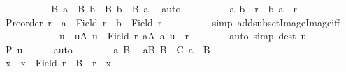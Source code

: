 \begin{isabellebody}
\ \ \ \ \ \ \isamarkupfalse%
\ {}\ \isamarkupfalse%
\ {\isachardoublequoteopen}{\isacharquery}{\kern0pt}B\ a\ {\isasymsubseteq}\ {\isacharquery}{\kern0pt}B\ b\ {\isasymor}\ {\isacharquery}{\kern0pt}B\ b\ {\isasymsubseteq}\ {\isacharquery}{\kern0pt}B\ a{\isachardoublequoteclose}\ \isamarkupfalse%
\ auto\isanewline
\ \ \ \ \ \ \isamarkupfalse%
\ \isamarkupfalse%
\ {\isachardoublequoteopen}{\isacharparenleft}{\kern0pt}a{\isacharcomma}{\kern0pt}\ b{\isacharparenright}{\kern0pt}\ {\isasymin}\ r\ {\isasymor}\ {\isacharparenleft}{\kern0pt}b{\isacharcomma}{\kern0pt}\ a{\isacharparenright}{\kern0pt}\ {\isasymin}\ r{\isachardoublequoteclose}\isanewline
\ \ \ \ \ \ \ \ \isamarkupfalse%
\ {\isacartoucheopen}Preorder\ r{\isacartoucheclose}\ \ {\isacartoucheopen}a\ {\isasymin}\ Field\ r{\isacartoucheclose}\ \ {\isacartoucheopen}b\ {\isasymin}\ Field\ r{\isacartoucheclose}\isanewline
\ \ \ \ \ \ \ \ \isamarkupfalse%
\ {\isacharparenleft}{\kern0pt}simp\ add{\isacharcolon}{\kern0pt}subset{\isacharunderscore}{\kern0pt}Image{}{\isacharunderscore}{\kern0pt}Image{}{\isacharunderscore}{\kern0pt}iff{\isacharparenright}{\kern0pt}\isanewline
\ \ \ \ \isamarkupfalse%
\isanewline
\ \ \ \ \isamarkupfalse%
\ \isamarkupfalse%
\ u\ \ uA{\isacharcolon}{\kern0pt}\ {\isachardoublequoteopen}u\ {\isasymin}\ Field\ r{\isachardoublequoteclose}\ {\isachardoublequoteopen}{\isasymforall}a{\isasymin}{\isacharquery}{\kern0pt}A{\isachardot}{\kern0pt}\ {\isacharparenleft}{\kern0pt}a{\isacharcomma}{\kern0pt}\ u{\isacharparenright}{\kern0pt}\ {\isasymin}\ r{\isachardoublequoteclose}\isanewline
\ \ \ \ \ \ \isamarkupfalse%
\ {\isacharparenleft}{\kern0pt}auto\ simp{\isacharcolon}{\kern0pt}\ dest{\isacharcolon}{\kern0pt}\ u{\isacharparenright}{\kern0pt}\isanewline
\ \ \ \ \isamarkupfalse%
\ {\isachardoublequoteopen}{\isacharquery}{\kern0pt}P\ u{\isachardoublequoteclose}\isanewline
\ \ \ \ \isamarkupfalse%
\ auto\isanewline
\ \ \ \ \ \ \isamarkupfalse%
\ a\ B\ \isamarkupfalse%
\ aB{\isacharcolon}{\kern0pt}\ {\isachardoublequoteopen}B\ {\isasymin}\ C{\isachardoublequoteclose}\ {\isachardoublequoteopen}a\ {\isasymin}\ B{\isachardoublequoteclose}\isanewline
\ \ \ \ \ \ \isamarkupfalse%
\ {}\ \isamarkupfalse%
\ x\ \ {\isachardoublequoteopen}x\ {\isasymin}\ Field\ r{\isachardoublequoteclose}\ \ {\isachardoublequoteopen}B\ {\isacharequal}{\kern0pt}\ r{\isasyminverse}\ {\isacharbackquote}{\kern0pt}{\isacharbackquote}{\kern0pt}\ {\isacharbraceleft}{\kern0pt}x{\isacharbraceright}{\kern0pt}{\isachardoublequoteclose}\ \isamarkupfalse%

\end{isabellebody}
